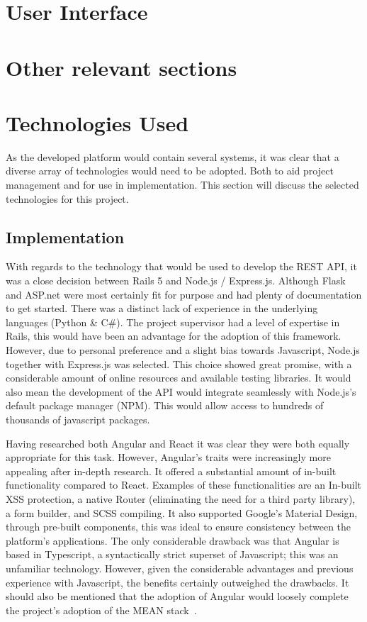 \section{User Interface}

\section{Other relevant sections}

\section{Technologies Used}
As the developed platform would contain several systems, it was clear that a diverse array of technologies would need to be adopted. Both to aid project management and for use in implementation. This section will discuss the selected technologies for this project.

\subsection{Implementation}
With regards to the technology that would be used to develop the REST API, it was a close decision between Rails 5 and Node.js / Express.js. Although Flask and ASP.net were most certainly fit for purpose and had plenty of documentation to get started. There was a distinct lack of experience in the underlying languages (Python \& C\#). The project supervisor had a level of expertise in Rails, this would have been an advantage for the adoption of this framework. However, due to personal preference and a slight bias towards Javascript, Node.js together with Express.js was selected. This choice showed great promise, with a considerable amount of online resources and available testing libraries. It would also mean the development of the API would integrate seamlessly with Node.js's default package manager (NPM). This would allow access to hundreds of thousands of javascript packages.

Having researched both Angular and React it was clear they were both equally appropriate for this task. However, Angular's traits were increasingly more appealing after in-depth research. It offered a substantial amount of in-built functionality compared to React. Examples of these functionalities are an In-built XSS protection, a native Router (eliminating the need for a third party library), a form builder, and SCSS compiling. It also supported Google's Material Design, through pre-built components, this was ideal to ensure consistency between the platform's applications. The only considerable drawback was that Angular is based in Typescript, a syntactically strict superset of Javascript; this was an unfamiliar technology. However, given the considerable advantages and previous experience with Javascript, the benefits certainly outweighed the drawbacks. It should also be mentioned that the adoption of Angular would loosely complete the project's adoption of the MEAN stack~\cite{mean_documentation_ref}.

